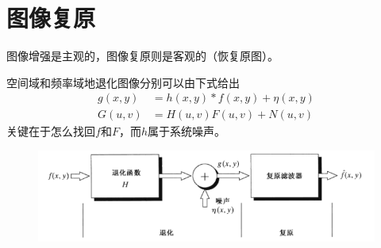 
\section{图像复原}
图像增强是主观的，图像复原则是客观的（恢复原图）。

空间域和频率域地退化图像分别可以由下式给出
\[\begin{aligned}
g(x,y)&=h(x,y)*f(x,y)+\eta(x,y)\\
G(u,v)&=H(u,v)F(u,v)+N(u,v)
\end{aligned}\]
关键在于怎么找回$f$和$F$，而$h$属于系统噪声。

\begin{figure}[H]
\centering
\includegraphics[width=0.8\linewidth]{fig/restoration.png}
\end{figure}

